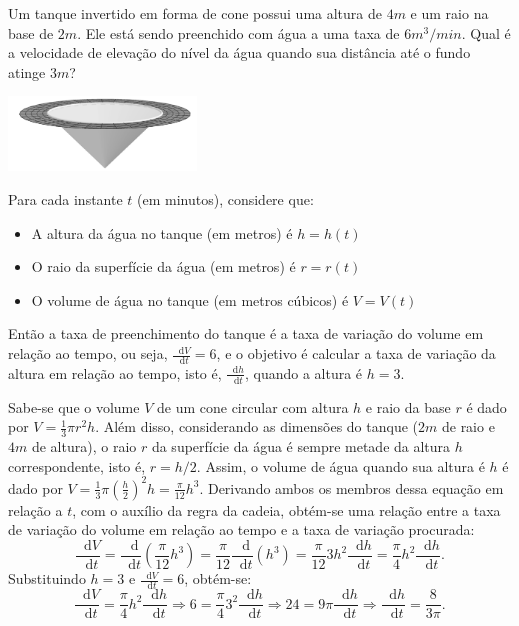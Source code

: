 \documentclass[12pt,a4paper]{article}
\newcommand*\diff{\mathop{}\!\mathrm{d}}
\begin{document}
\begin{ExerciseList}
\Exercise[title={2,0}]
\begin{minipage}{0.6\textwidth}
    Um tanque invertido em forma de cone possui uma altura de $4m$ e um raio na base de $2m$. Ele está sendo preenchido com água a uma taxa de $6m^3/min$. Qual é a velocidade de elevação do nível da água quando sua distância até o fundo atinge $3m$?
\end{minipage}\hfill
\begin{minipage}{0.3\textwidth}
    \begin{center}
        \includegraphics[width=5cm]{img/prova-3-nex-cone.png}
    \end{center}
\end{minipage}
\Answer Para cada instante $t$ (em minutos), considere que:
\begin{itemize}
    \item A altura da água no tanque (em metros) é $h = h(t)$
    \item O raio da superfície da água (em metros) é $r = r(t)$
    \item O volume de água no tanque (em metros cúbicos) é $V = V(t)$
\end{itemize}
Então a taxa de preenchimento do tanque é a taxa de variação do volume em relação ao tempo, ou seja, $\frac{\diff{V}}{\diff{t}} = 6$, e o objetivo é calcular a taxa de variação da altura em relação ao tempo, isto é, $\frac{\diff{h}}{\diff{t}}$, quando a altura é $h=3$.

Sabe-se que o volume $V$ de um cone circular com altura $h$ e raio da base $r$ é dado por $V = \frac{1}{3}\pi r^2 h$. Além disso, considerando as dimensões do tanque ($2 m$ de raio e $4 m$ de altura), o raio $r$ da superfície da água é sempre metade da altura $h$ correspondente, isto é, $r = h/2$. Assim, o volume de água quando sua altura é $h$ é dado por $V = \frac{1}{3}\pi {\left(\frac{h}{2}\right)}^2 h = \frac{\pi}{12} h^3.$ Derivando ambos os membros dessa equação em relação a $t$, com o auxílio da regra da cadeia, obtém-se uma relação entre a taxa de variação do volume em relação ao tempo e a taxa de variação procurada:
\[
    \frac{\diff{V}}{\diff{t}}
    = \frac{\diff}{\diff{t}}\left(\frac{\pi}{12} h^3\right)
    = \frac{\pi}{12} \frac{\diff}{\diff{t}}\left(h^3\right)
    = \frac{\pi}{12} 3h^2 \frac{\diff{h}}{\diff{t}}
    = \frac{\pi}{4} h^2 \frac{\diff{h}}{\diff{t}}.
\]
Substituindo $h=3$ e $\frac{\diff{V}}{\diff{t}} = 6$, obtém-se:
\[
    \frac{\diff{V}}{\diff{t}}
    = \frac{\pi}{4} h^2 \frac{\diff{h}}{\diff{t}}
    \Rightarrow
    6
    = \frac{\pi}{4} 3^2 \frac{\diff{h}}{\diff{t}}
    \Rightarrow
    24
    = 9\pi \frac{\diff{h}}{\diff{t}}
    \Rightarrow
    \frac{\diff{h}}{\diff{t}}
    = \frac{8}{3\pi}.
\]


\end{ExerciseList}
\end{document}

